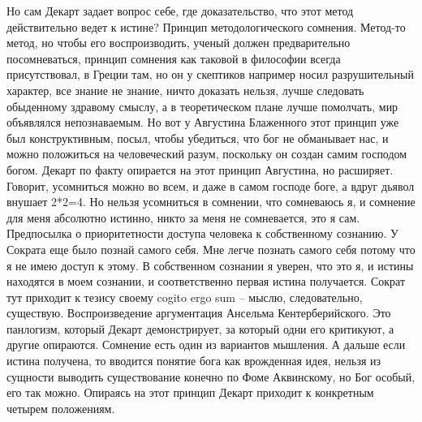 \documentclass[a4paper, 12pt]{article}
\begin{document}
Но сам Декарт задает вопрос себе, где доказательство, что этот метод 
действительно ведет к истине? Принцип методологического сомнения. 
Метод-то метод, но чтобы его воспроизводить, ученый должен 
предварительно посомневаться, принцип сомнения как таковой в философии 
всегда присутствовал, в Греции там, но он у скептиков например носил 
разрушительный характер, все знание не знание, ничто доказать нельзя, 
лучше следовать обыденному здравому смыслу, а в теоретическом плане 
лучше помолчать, мир объявлялся непознаваемым. Но вот у Августина 
Блаженного этот принцип уже был конструктивным, посыл, чтобы убедиться, 
что бог не обманывает нас, и можно положиться на человеческий разум, 
поскольку он создан самим господом богом. Декарт по факту опирается на 
этот принцип Августина, но расширяет. Говорит, усомниться можно во всем, 
и даже в самом господе боге, а вдруг дьявол внушает 2*2=4. Но нельзя 
усомниться в сомнении, что сомневаюсь я, и сомнение для меня абсолютно 
истинно, никто за меня не сомневается, это я сам. Предпосылка 
о приоритетности доступа человека к собственному сознанию. У Сократа еще 
было познай самого себя. Мне легче познать самого себя потому что я не 
имею доступ к этому. В собственном сознании я уверен, что это я, 
и истины находятся в моем сознании, и соответственно первая истина 
получается. Сократ тут приходит к тезису своему cogito ergo sum -- 
мыслю, следовательно, существую. Воспроизведение аргументация Ансельма 
Кентерберийского. Это панлогизм, который Декарт демонстрирует, за 
который одни его критикуют, а другие опираются. Сомнение есть один из 
вариантов мышления. А дальше если истина получена, то вводится понятие 
бога как врожденная идея, нельзя из сущности выводить существование 
конечно по Фоме Аквинскому, но Бог особый, его так можно. Опираясь на 
этот принцип Декарт приходит к конкретным четырем положениям.
\end{document}
